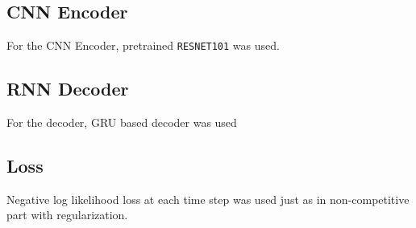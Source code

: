 \documentclass[11pt]{article}
\begin{document}
\subsection{CNN Encoder}
\label{sec-2-1}
For the CNN Encoder, pretrained \texttt{RESNET101} was used.
\subsection{RNN Decoder}
\label{sec-2-2}
For the decoder, GRU based decoder was used
\subsection{Loss}
\label{sec-2-3}
Negative log likelihood loss at each time step was used just as in
non-competitive part with regularization.
\end{document}
